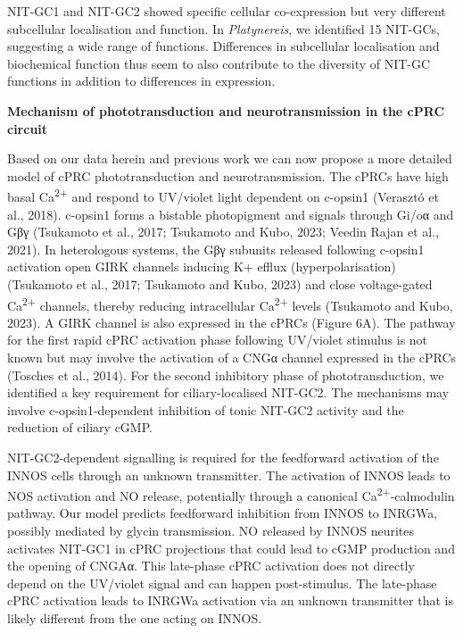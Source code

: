 \documentclass[
  10pt,
  onecolumn]{article}
\begin{document}
NIT-GC1 and NIT-GC2 showed specific cellular co-expression but very
different subcellular localisation and function. In \emph{Platynereis},
we identified 15 NIT-GCs, suggesting a wide range of functions.
Differences in subcellular localisation and biochemical function thus
seem to also contribute to the diversity of NIT-GC functions in addition
to differences in expression.

\textbf{Mechanism of phototransduction and neurotransmission in the cPRC
circuit}

Based on our data herein and previous work we can now propose a more
detailed model of cPRC phototransduction and neurotransmission. The
cPRCs have high basal Ca\textsuperscript{2+} and respond to UV/violet
light dependent on c-opsin1 (Verasztó et al., 2018). c-opsin1 forms a
bistable photopigment and signals through Gi/oα and Gβγ (Tsukamoto et
al., 2017; Tsukamoto and Kubo, 2023; Veedin Rajan et al., 2021). In
heterologous systems, the Gβγ subunits released following c-opsin1
activation open GIRK channels inducing K+ efflux (hyperpolarisation)
(Tsukamoto et al., 2017; Tsukamoto and Kubo, 2023) and close
voltage-gated Ca\textsuperscript{2+} channels, thereby reducing
intracellular Ca\textsuperscript{2+} levels (Tsukamoto and Kubo, 2023).
A GIRK channel is also expressed in the cPRCs (Figure 6A). The pathway
for the first rapid cPRC activation phase following UV/violet stimulus
is not known but may involve the activation of a CNGα channel expressed
in the cPRCs (Tosches et al., 2014). For the second inhibitory phase of
phototransduction, we identified a key requirement for ciliary-localised
NIT-GC2. The mechanisms may involve c-opsin1-dependent inhibition of
tonic NIT-GC2 activity and the reduction of ciliary cGMP.

NIT-GC2-dependent signalling is required for the feedforward activation
of the INNOS cells through an unknown transmitter. The activation of
INNOS leads to NOS activation and NO release, potentially through a
canonical Ca\textsuperscript{2+}-calmodulin pathway. Our model predicts
feedforward inhibition from INNOS to INRGWa, possibly mediated by glycin
transmission. NO released by INNOS neurites activates NIT-GC1 in cPRC
projections that could lead to cGMP production and the opening of CNGAα.
This late-phase cPRC activation does not directly depend on the
UV/violet signal and can happen post-stimulus. The late-phase cPRC
activation leads to INRGWa activation via an unknown transmitter that is
likely different from the one acting on INNOS.
\end{document}
